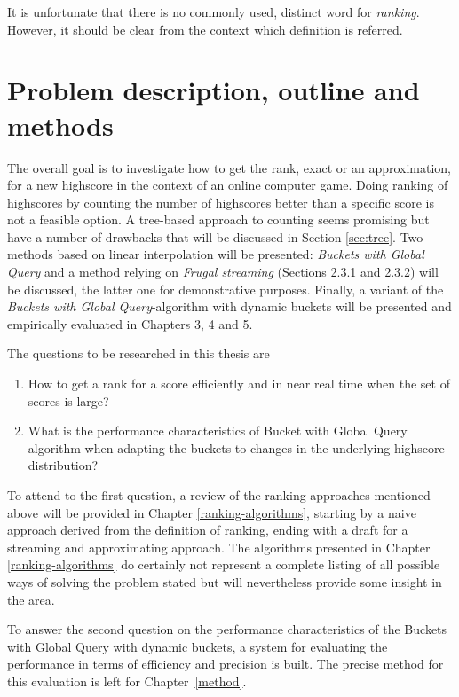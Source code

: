 It is unfortunate that there is no commonly used, distinct word for \emph{ranking}. However, it should be clear from the context which definition is referred.

\section{Problem description, outline and methods}

The overall goal is to investigate how to get the rank, exact or an approximation, for a new highscore in the context of an online computer game. Doing ranking of highscores by counting the number of highscores better than a specific score is not a feasible option. A tree-based approach to counting seems promising but have a number of drawbacks that will be discussed in Section \ref{sec:tree}. Two methods based on linear interpolation will be presented: \emph{Buckets with Global Query} and a method relying on \emph{Frugal streaming} (Sections 2.3.1 and 2.3.2) will be discussed, the latter one for demonstrative purposes. Finally, a variant of the \emph{Buckets with Global Query}-algorithm with dynamic buckets will be presented and empirically evaluated in Chapters 3, 4 and 5.

The questions to be researched in this thesis are

\begin{enumerate}
  \setlength\itemsep{-0.4em}
\item How to get a rank for a score efficiently and in near real time when the set of scores is large?
\item What is the performance characteristics of Bucket with Global Query algorithm when adapting the buckets to changes in the underlying highscore distribution?
\end{enumerate}

To attend to the first question, a review of the ranking approaches mentioned above will be provided in Chapter \ref{ranking-algorithms}, starting by a naive approach derived from the definition of ranking, ending with a draft for a streaming and approximating approach. The algorithms presented in Chapter \ref{ranking-algorithms} do certainly not represent a complete listing of all possible ways of solving the problem stated but will nevertheless provide some insight in the area.

To answer the second question on the performance characteristics of the Buckets with Global Query with dynamic buckets, a system for evaluating the performance in terms of efficiency and precision is built. The precise method for this evaluation is left for \mbox{Chapter \ref{method}}.
